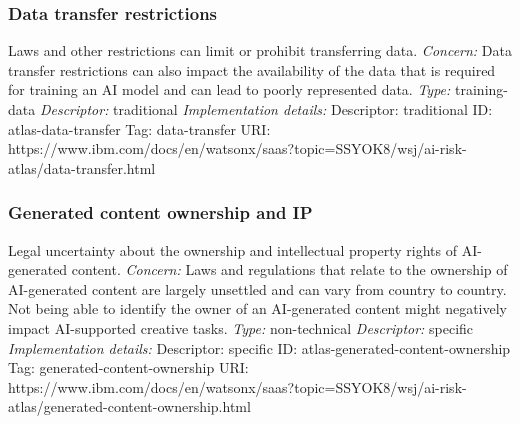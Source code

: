 \documentclass{article}
\begin{document}
\subsubsection*{Data transfer restrictions}
Laws and other restrictions can limit or prohibit transferring data.\newline
\textit{Concern: }Data transfer restrictions can also impact the availability of the data that is required for training an AI model and can lead to poorly represented data.\newline\newline
\textit{Type: }training-data\newline
\textit{Descriptor: }traditional \newline\newline
\textit{Implementation details:} \newline
Descriptor: traditional \newline
ID: atlas-data-transfer \newline
Tag: data-transfer \newline
URI:  https://www.ibm.com/docs/en/watsonx/saas?topic=SSYOK8/wsj/ai-risk-atlas/data-transfer.html\newline
\subsubsection*{Generated content ownership and IP}
Legal uncertainty about the ownership and intellectual property rights of AI-generated content.\newline
\textit{Concern: }Laws and regulations that relate to the ownership of AI-generated content are largely unsettled and can vary from country to country. Not being able to identify the owner of an AI-generated content might negatively impact AI-supported creative tasks.\newline\newline
\textit{Type: }non-technical\newline
\textit{Descriptor: }specific \newline\newline
\textit{Implementation details:} \newline
Descriptor: specific \newline
ID: atlas-generated-content-ownership \newline
Tag: generated-content-ownership \newline
URI:  https://www.ibm.com/docs/en/watsonx/saas?topic=SSYOK8/wsj/ai-risk-atlas/generated-content-ownership.html\newline
\end{document}
